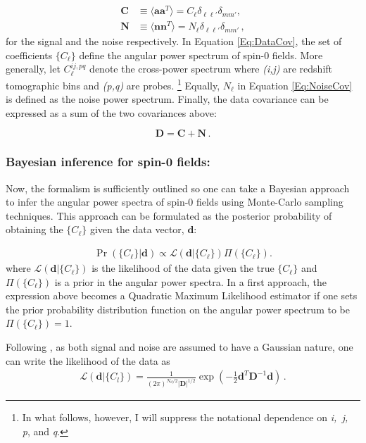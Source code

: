 \begin{align}
\label{Eq:DataCov} \mathbf{C} & \equiv \langle \textbf{a} \textbf{a}^T \rangle = C_{\ell}\delta_{\ell \ell'}\delta_{m m'}, \\ 
\label{Eq:NoiseCov} \mathbf{N} & \equiv \langle \textbf{n} \textbf{n}^T \rangle = N_{\ell}\delta_{\ell \ell'}\delta_{m m'} \, , 
\end{align}
\noindent for the signal and the noise respectively. In Equation \eqref{Eq:DataCov}, the set of coefficients $\{C_{\ell}\}$ define the angular power spectrum of spin-0 fields. More generally, let $C_{\ell}^{ij, pq}$ denote the cross-power spectrum where \textit{(i,j)} are redshift tomographic bins and \textit{(p,q)} are probes. \footnote{In what follows, however, I will suppress the notational dependence on \textit{i,\, j,\, p}, and \textit{q}.} Equally, $N_{\ell}$ in Equation \eqref{Eq:NoiseCov} is defined as the noise power spectrum. Finally, the data covariance can be expressed as a sum of the two covariances above:

\begin{equation}
\textbf{D} = \textbf{C} + \textbf{N} \, .
\end{equation}

\subsubsection{Bayesian inference for spin-0 fields:}
\qquad Now, the formalism is sufficiently outlined so one can take a Bayesian approach to infer the angular power spectra of spin-0 fields using Monte-Carlo sampling techniques. This approach can be formulated as the posterior probability of obtaining the $\{C_{\ell}\}$ given the data vector, $\mathbf{d}$:

\begin{align}
\Pr (\{C_{\ell}\}|\mathbf{d}) \propto \mathcal{L} (\mathbf{d}|\{C_{\ell}\})\Pi(\{C_{\ell}\}).
\label{Eq:LikelFirstExpression}
\end{align}
\noindent where $\mathcal{L} (\mathbf{d}|\{C_{\ell}\})$ is the likelihood of the data given the true $\{C_{\ell}\}$ and $\Pi(\{C_{\ell}\})$ is a prior in the angular power spectra. In a first approach, the expression above becomes a Quadratic Maximum Likelihood estimator \citep{1994Gorsky,1997Tegmark,Hobson2002,Efstat2004,Boris2013} if one sets the prior probability distribution function on the angular power spectrum to be $\Pi(\{C_{\ell}\}) = 1$. 

\qquad Following \cite{Borrill1999,Hobson2002,Taylor2008}, as both signal and noise are assumed to have a Gaussian nature, one can write the likelihood of the data as
\begin{align}
\mathcal{L}(\mathbf{d}|\{C_{l}\}) = \frac{1}{(2\pi)^{N_d/2}|\mathbf{D}|^{1/2}}\exp \left(-\frac{1}{2}\mathbf{d}^T\mathbf{D}^{-1}\mathbf{d} \right)\, .
\label{Eq:LikelihoodSpin0}
\end{align}

